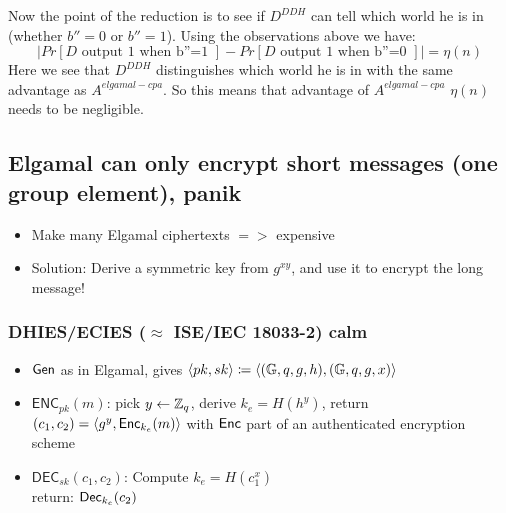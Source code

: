 \documentclass[12pt]{article}
\begin{document}
Now the point of the reduction is to see if $D^{DDH}$ can tell which world he is in (whether $b''=0$ or $b''=1$).
\newpage
Using the observations above we have:
\begin{equation*}
|Pr[D \text{ output } 1 \text{ when b''=1 }] - Pr[D \text{ output } 1 \text{ when b''=0 }]| = \eta(n)
\end{equation*}
Here we see that $D^{DDH}$ distinguishes which world he is in with the same advantage as $A^{elgamal-cpa}$. So this means that advantage of $A^{elgamal-cpa}$ $\eta(n)$ needs to be negligible.


\subsection{Elgamal can only encrypt short messages (one group element), panik} 
\begin{itemize}
\item Make many Elgamal ciphertexts $=>$ expensive
\item Solution: Derive a symmetric key from $g^{xy}$, and use it to encrypt the long message!
\end{itemize}

\subsubsection{DHIES/ECIES ($\approx$ ISE/IEC 18033-2) calm}
\begin{itemize}
\item $\operatorname{\mathsf{Gen}}$ as in Elgamal, gives $\langle pk,sk \rangle \coloneqq \langle(\mathbb{G},q,g,h),(\mathbb{G},q,g,x) \rangle$
\item $\mathsf{ENC}_{pk}(m)$: pick $y\leftarrow \mathbb{Z}_q$, derive $k_e = H(h^y)$, return $(c_1,c_2)=\langle g^y, \operatorname{\mathsf{Enc}}_{k_e}(m) \rangle$ with $\operatorname{\mathsf{Enc}}$ part of an authenticated encryption scheme 
\item $\mathsf{DEC}_{sk}(c_1,c_2)$: Compute $k_e = H(c_1^x)$\\
return: $\operatorname{\mathsf{Dec}}_{k_e}(c_2)$
\end{itemize}
\end{document}
